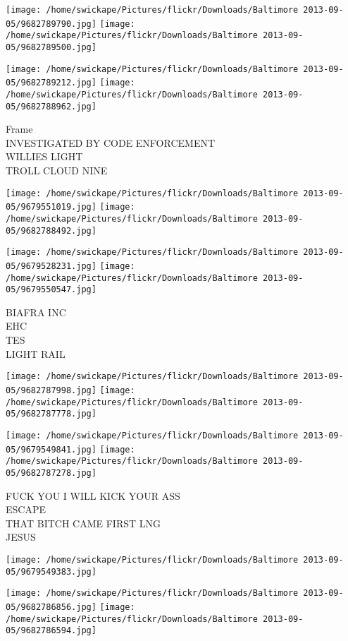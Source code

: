 \documentclass[10pt,letterpaper]{article}
\begin{document}
\texttt{[image: /home/swickape/Pictures/flickr/Downloads/Baltimore 2013-09-05/9682789790.jpg]}
\texttt{[image: /home/swickape/Pictures/flickr/Downloads/Baltimore 2013-09-05/9682789500.jpg]}

\texttt{[image: /home/swickape/Pictures/flickr/Downloads/Baltimore 2013-09-05/9682789212.jpg]}
\texttt{[image: /home/swickape/Pictures/flickr/Downloads/Baltimore 2013-09-05/9682788962.jpg]}

Frame\\
INVESTIGATED BY CODE ENFORCEMENT\\
WILLIES LIGHT\\
TROLL CLOUD NINE
\pagebreak

\texttt{[image: /home/swickape/Pictures/flickr/Downloads/Baltimore 2013-09-05/9679551019.jpg]}
\texttt{[image: /home/swickape/Pictures/flickr/Downloads/Baltimore 2013-09-05/9682788492.jpg]}

\texttt{[image: /home/swickape/Pictures/flickr/Downloads/Baltimore 2013-09-05/9679528231.jpg]}
\texttt{[image: /home/swickape/Pictures/flickr/Downloads/Baltimore 2013-09-05/9679550547.jpg]}

BIAFRA INC\\
EHC\\
TES\\
LIGHT RAIL
\pagebreak

\texttt{[image: /home/swickape/Pictures/flickr/Downloads/Baltimore 2013-09-05/9682787998.jpg]}
\texttt{[image: /home/swickape/Pictures/flickr/Downloads/Baltimore 2013-09-05/9682787778.jpg]}

\texttt{[image: /home/swickape/Pictures/flickr/Downloads/Baltimore 2013-09-05/9679549841.jpg]}
\texttt{[image: /home/swickape/Pictures/flickr/Downloads/Baltimore 2013-09-05/9682787278.jpg]}

FUCK YOU I WILL KICK YOUR ASS\\
ESCAPE\\
THAT BITCH CAME FIRST LNG\\
JESUS
\pagebreak

\texttt{[image: /home/swickape/Pictures/flickr/Downloads/Baltimore 2013-09-05/9679549383.jpg]}

\vspace{0.25in}
\texttt{[image: /home/swickape/Pictures/flickr/Downloads/Baltimore 2013-09-05/9682786856.jpg]}
\texttt{[image: /home/swickape/Pictures/flickr/Downloads/Baltimore 2013-09-05/9682786594.jpg]}
\end{document}
